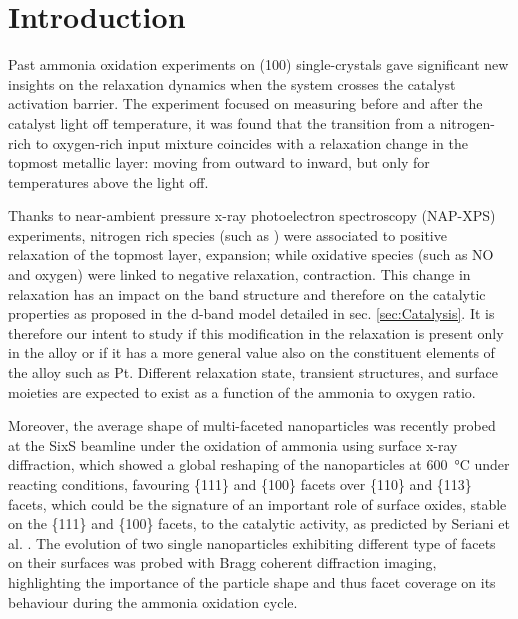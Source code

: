 \section{Introduction}

Past ammonia oxidation experiments on  (100) \parencite{Resta2020a} single-crystals gave significant new insights on the relaxation dynamics when the system crosses the catalyst activation barrier.
The experiment focused on measuring before and after the catalyst light off temperature, it was found that the transition from a nitrogen-rich to oxygen-rich input mixture coincides with a relaxation change in the topmost metallic layer: moving from outward to inward, but only for temperatures above the light off.

Thanks to near-ambient pressure x-ray photoelectron spectroscopy (NAP-XPS) experiments, nitrogen rich species (such as ) were associated to positive relaxation of the topmost layer, expansion; while oxidative species (such as NO and oxygen) were linked to negative relaxation, contraction.
This change in relaxation has an impact on the band structure and therefore on the catalytic properties as proposed in the d-band model detailed in sec. \ref{sec:Catalysis}.
It is therefore our intent to study if this modification in the relaxation is present only in the  alloy or if it has a more general value also on the constituent elements of the alloy such as Pt.
Different relaxation state, transient structures, and surface moieties are expected to exist as a function of the ammonia to oxygen ratio.

Moreover, the average shape of multi-faceted nanoparticles was recently probed at the SixS beamline under the oxidation of ammonia using surface x-ray diffraction, which showed a global reshaping of the nanoparticles at \qty{600}{\degreeCelsius} under reacting conditions, favouring \{111\} and \{100\} facets over \{110\} and \{113\} facets, which could be the signature of an important role of surface oxides, stable on the \{111\} and \{100\} facets, to the catalytic activity, as predicted by Seriani et al. \parencite*{Seriani2008}.
The evolution of two single nanoparticles exhibiting different type of facets on their surfaces was probed with Bragg coherent diffraction imaging, highlighting the importance of the particle shape and thus facet coverage on its behaviour during the ammonia oxidation cycle.

